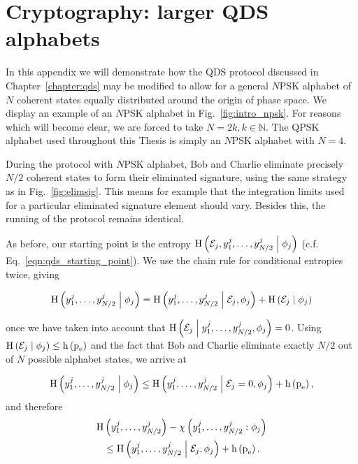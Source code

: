 \chapter{Cryptography: larger QDS alphabets}\label{appendix:qds_larger_alphabets}

In this appendix we will demonstrate how the QDS protocol discussed in Chapter~\ref{chapter:qds} may be modified to allow for a general $N$PSK alphabet of $N$ coherent states equally distributed around the origin of phase space. We display an example of an $N$PSK alphabet in Fig.~\ref{fig:intro_npsk}. For reasons which will become clear, we are forced to take $N = 2 k, k \in \mathbb{N}$. The QPSK alphabet used throughout this Thesis is simply an $N$PSK alphabet with $N=4$.



During the protocol with $N$PSK alphabet, Bob and Charlie eliminate precisely $N/2$ coherent states to form their eliminated signature, using the same strategy as in Fig.~\ref{fig:elimsig}. This means for example that the integration limits used for a particular eliminated signature element should vary. Besides this, the running of the protocol remains identical.

As before, our starting point is the entropy $\text{H}\left( \mathcal{E}_j, y_1^j, \dots, y_{N/2}^j \; \middle| \; \phi_j \right)$ (c.f. Eq.~\ref{eqn:qds_starting_point}). We use the chain rule for conditional entropies twice, giving

\begin{equation}
\text{H}\left(y_1^j, \dots, y_{N/2}^j \; \middle| \; \phi_j\right) = \text{H}\left(y_1^j, \dots, y_{N/2}^j \; \middle| \; \mathcal{E}_j, \phi_j \right) + \text{H}\left(\mathcal{E}_j \; \middle| \; \phi_j\right)
\end{equation}

\noindent once we have taken into account that $\text{H}\left(\mathcal{E}_j \; \middle| \; y_1^j, \dots, y_{N/2}^j, \phi_j \right)=0$. Using $\text{H}\left(\mathcal{E}_j \; \middle| \; \phi_j \right) \le \text{h}\left(\text{p}_{\text{e}}\right)$ and the fact that Bob and Charlie eliminate exactly $N/2$ out of $N$ possible alphabet states, we arrive at

\begin{equation}
\text{H}\left(y_1^j, \dots, y_{N/2}^j \; \middle| \; \phi_j\right) \le \text{H}\left(y_1^j, \dots, y_{N/2}^j\; \middle| \; \mathcal{E}_j = 0, \phi_j\right) + \text{h}\left(\text{p}_{\text{e}}\right),
\end{equation}
and therefore
\begin{align}
\text{H}&\left(y_1^j, \dots, y_{N/2}^j\right) - \chi\left(y_1^j, \dots, y_{N/2}^j : \phi_j\right) \notag \\
%
& \le \text{H}\left(y_1^j, \dots, y_{N/2}^j \given \mathcal{E}_j, \phi_j\right) + \text{h}\left(\pe\right).
\end{align}

